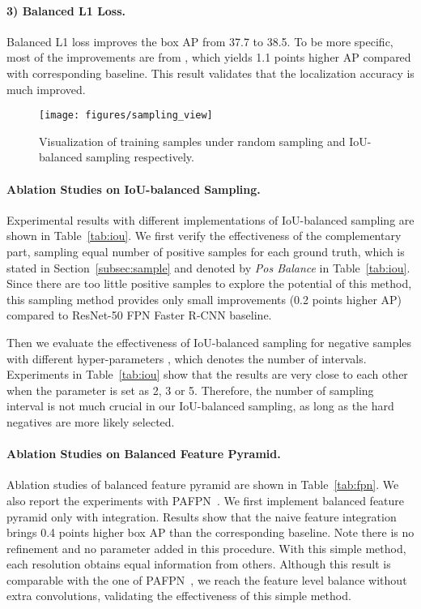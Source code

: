 \documentclass[10pt,twocolumn,letterpaper]{article}
\begin{document}
\vspace{-12pt}
\paragraph{3) Balanced L1 Loss.}
Balanced L1 loss improves the box AP from 37.7 to 38.5.
To be more specific, most of the improvements are from , which yields 1.1 points higher AP compared with corresponding baseline.
This result validates that the localization accuracy is much improved.

\begin{figure}
	\centering
	\texttt{[image: figures/sampling\_view]}
	\caption{Visualization of training samples under random sampling and IoU-balanced sampling respectively.}
	\label{fig:sampling}
	\vspace{-10pt}
\end{figure}

\vspace{-12pt}
\paragraph{Ablation Studies on IoU-balanced Sampling.}
Experimental results with different implementations of IoU-balanced sampling are shown in Table~\ref{tab:iou}.
We first verify the effectiveness of the complementary part, \ie sampling equal number of positive samples for each ground truth, which is stated in Section~\ref{subsec:sample} and denoted by \emph{Pos Balance} in Table~\ref{tab:iou}.
Since there are too little positive samples to explore the potential of this method, this sampling method provides only small improvements (0.2 points higher AP) compared to ResNet-50 FPN Faster R-CNN baseline.

Then we evaluate the effectiveness of IoU-balanced sampling for negative samples with different hyper-parameters , which denotes the number of intervals.
Experiments in Table~\ref{tab:iou} show that the results are very close to each other when the parameter  is set as 2, 3 or 5.
Therefore, the number of sampling interval is not much crucial in our IoU-balanced sampling, as long as the hard negatives are more likely selected.

\vspace{-12pt}
\paragraph{Ablation Studies on Balanced Feature Pyramid.}
Ablation studies of balanced feature pyramid are shown in Table~\ref{tab:fpn}.
We also report the experiments with PAFPN~\cite{panet}.
We first implement balanced feature pyramid only with integration.
Results show that the naive feature integration brings 0.4 points higher box AP than the corresponding baseline.
Note there is no refinement and no parameter added in this procedure.
With this simple method, each resolution obtains equal information from others.
Although this result is comparable with the one of PAFPN~\cite{panet}, we reach the feature level balance without extra convolutions, validating the effectiveness of this simple method.
\end{document}
